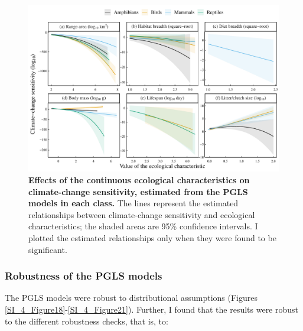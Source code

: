 \clearpage
\begin{figure}[h!]
\centering
\includegraphics[scale=0.7]{figures/Chapter4/Figure6}
\caption[Effects of the continuous ecological characteristics on climate-change sensitivity, estimated from the PGLS models in each class.]{\textbf{Effects of the continuous ecological characteristics on climate-change sensitivity, estimated from the PGLS models in each class.} The lines represent the estimated relationships between climate-change sensitivity and ecological characteristics; the shaded areas are 95\% confidence intervals. I plotted the estimated relationships only when they were found to be significant.}
\label{chap4_fig6}
\end{figure}

\subsubsection{Robustness of the PGLS models}
The PGLS models were robust to distributional assumptions (Figures \ref{SI_4_Figure18}-\ref{SI_4_Figure21}). Further, I found that the results were robust to the different robustness checks, that is, to:

